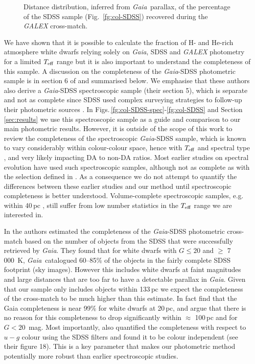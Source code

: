 \documentclass[a4paper,fleqn,usenatbib]{mnras}
\newcommand{\gaia}{{\it Gaia}}
\begin{document}
\begin{figure}
 \centering
  \caption{Distance distribution, inferred from \gaia\ parallax, of the percentage of the SDSS sample (Fig.~\ref{fg:col-SDSS}) recovered during the {\it GALEX} cross-match.}
 \label{fg:dist-distr}
\end{figure}

We have shown that it is possible to calculate the fraction of H- and He-rich atmosphere white dwarfs relying solely on \gaia, SDSS and {\it GALEX} photometry for a limited $T_{\rm eff}$ range but it is also important to understand the completeness of this sample. A discussion on the completeness of the \gaia-SDSS photometric sample is in section 6 of \citet{ngf19} and summarised below. We emphasise that these authors also derive a \gaia-SDSS spectroscopic sample (their section 5), which is separate and not as complete since SDSS used complex surveying strategies to follow-up their photometric sources \citep[see, e.g.,][]{eisenstein06}. In Figs.\,\ref{fg:col-SDSS-spec}-\ref{fg:col-SDSS} and Section\,\ref{sec:results} we use this spectroscopic sample as a guide and comparison to our main photometric results. However, it is outside of the scope of this work to review the completeness of the spectroscopic \gaia-SDSS sample, which is known to vary considerably within colour-colour space, hence with $T_{\rm eff}$ and spectral type \citep{ngf15,ngf19}, and very likely impacting DA to non-DA ratios. Most earlier studies on spectral evolution have used such spectroscopic samples, although not as complete as with the selection defined in \citet{ngf19}. As a consequence we do not attempt to quantify the differences between these earlier studies and our method until spectroscopic completeness is better understood. Volume-complete spectroscopic samples, e.g. within 40\,pc \citep{limoges15}, still suffer from low number statistics in the $T_{\rm eff}$ range we are interested in.

In \citet{ngf19} the authors estimated the completeness of the \gaia-SDSS photometric cross-match based on the number of objects from the SDSS that were successfully retrieved by \gaia. They found that for white dwarfs with $G\leq20$ and \teff$\geq$ 7\,000~K, \gaia\ catalogued 60--85\% of the objects in the fairly complete SDSS footprint (sky images). However this includes white dwarfs at faint magnitudes and large distances that are too far to have a detectable parallax in \gaia. Given that our sample only includes objects within 133\,pc we expect the completeness of the cross-match to be much higher than this estimate. In fact \citet{hollands18b} find that the Gaia completeness is near 99\% for white dwarfs at 20\,pc, and \citet{ngf19} argue that there is no reason for this completeness to drop significantly within $\approx$ 100\,pc and for $G<20$~mag. Most importantly, \citet{ngf19} also quantified the completeness with respect to $u-g$ colour using the SDSS filters and found it to be colour independent (see their figure 18). This is a key parameter that makes our photometric method potentially more robust than earlier spectroscopic studies.
\end{document}
